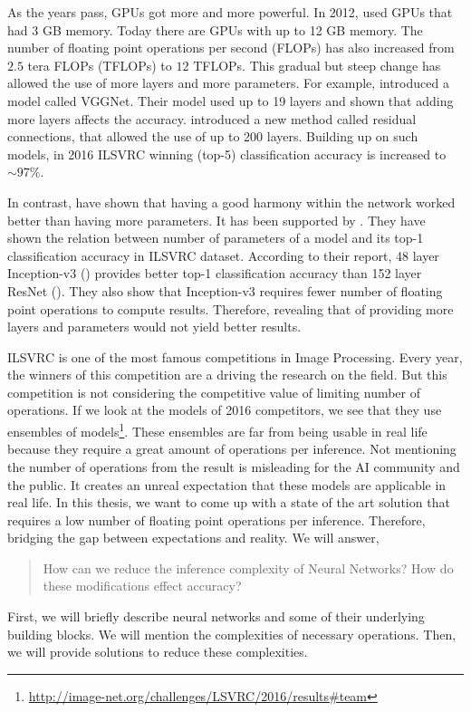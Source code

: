 As the years pass, GPUs got more and more powerful. In 2012, \cite{krizhevsky2012imagenet} used GPUs that had 3 GB memory. Today there are GPUs with up to 12 GB memory. The number of floating point operations per second (FLOPs) has also increased from $2.5$ tera FLOPs (TFLOPs) to $12$ TFLOPs. This gradual but steep change has allowed the use of more layers and more parameters. For example, \cite{Simonyan:2014aa} introduced a model called VGGNet. Their model used up to 19 layers and shown that adding more layers affects the accuracy. \cite{He:2015aa} introduced a new method called residual connections, that allowed the use of up to 200 layers. Building up on such models, in 2016 ILSVRC winning (top-5) classification accuracy is increased to $\sim 97\%$. 

In contrast, \cite{Szegedy:2014aa} have shown that having a good harmony within the network worked better than having more parameters. It has been supported by \cite{Canziani:2016aa}. They have shown the relation between number of parameters of a model and its top-1 classification accuracy in ILSVRC dataset. According to their report, 48 layer Inception-v3 (\cite{Szegedy_2016_CVPR}) provides better top-1 classification accuracy than 152 layer ResNet (\cite{He:2015aa}). They also show that Inception-v3 requires fewer number of floating point operations to compute results. Therefore, revealing that of providing more layers and parameters would not yield better results. 

ILSVRC is one of the most famous competitions in Image Processing. Every year, the winners of this competition are a driving the research on the field. But this competition is not considering the competitive value of limiting number of operations. If we look at the models of 2016 competitors, we see that they use ensembles of models\footnote{\url{http://image-net.org/challenges/LSVRC/2016/results\#team}}. These ensembles are far from being usable in real life because they require a great amount of operations per inference. Not mentioning the number of operations from the result is misleading for the AI community and the public. It creates an unreal expectation that these models are applicable in real life. In this thesis, we want to come up with a state of the art solution that requires a low number of floating point operations per inference. Therefore, bridging the gap between expectations and reality. We will answer,
\begin{quote}
How can we reduce the inference complexity of Neural Networks?
How do these modifications effect accuracy?
\end{quote}
First, we will briefly describe neural networks and some of their underlying building blocks. We will mention the complexities of necessary operations. Then, we will provide solutions to reduce these complexities.

